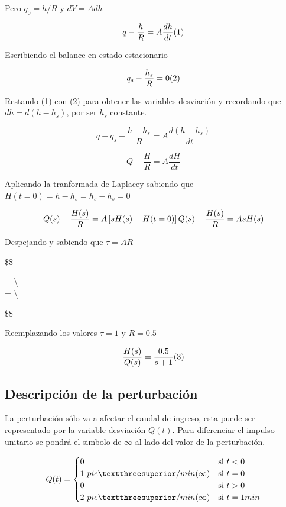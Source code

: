 \documentclass[
  letterpaper,
  DIV=11,
  numbers=noendperiod]{scrreprt}
\begin{document}
Pero \(q_0 = h/R\) y \(dV = Adh\)

\[
q- \frac{h}{R} = A\frac{dh}{dt} \space\space\space\space (1)
\]

Escribiendo el balance en estado estacionario

\[
q_s- \frac{h_s}{R} = 0 \space\space\space\space (2)
\]

Restando (1) con (2) para obtener las variables desviación y recordando
que \(dh=d(h-h_s)\), por ser \(h_s\) constante.

\[
q-q_s-\frac{h-h_s}{R}=A\frac{d(h-h_s)}{dt}
\]

\[
Q - \frac{H}{R} = A\frac{dH}{dt}
\]

Aplicando la tranformada de Laplacey sabiendo que
\(H(t=0)= h-h_s=h_s-h_s=0\)

\[
Q(s) - \frac{H(s)}{R} = A\left[sH(s)-H(t=0)\right]\\
\\
Q(s) - \frac{H(s)}{R} = AsH(s)
\]

Despejando y sabiendo que \(\tau=AR\)

\$\$

= \textbackslash{} \[
\] = \textbackslash{}

\$\$

Reemplazando los valores \(\tau = 1\) y \(R=0.5\)

\[
\frac{H(s)}{Q(s)}=\frac{0.5}{s+1} \space\space\space\space (3)\\
\]

\hypertarget{descripciuxf3n-de-la-perturbaciuxf3n-1}{%
\subsection{Descripción de la
perturbación}\label{descripciuxf3n-de-la-perturbaciuxf3n-1}}

La perturbación sólo va a afectar el caudal de ingreso, esta puede ser
representado por la variable desviación \(Q(t)\). Para diferenciar el
impulso unitario se pondrá el simbolo de \(\infty\) al lado del valor de
la perturbación.

\[
Q(t)=
\begin{cases}
   0 &\text{si } t < 0 \\
   1 \space\ pie³/min\space \space\space(\infty) &\text{si } t=0\\
   0 \space\  &\text{si } t>0\\
   2 \space\ pie³/min\space\space\space (\infty) &\text{si } t=1 min\\
\end{cases}
\]
\end{document}
